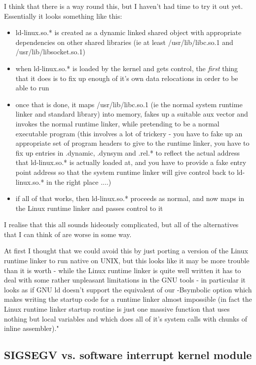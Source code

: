 \documentclass[letterpaper]{article}
\begin{document}
I think that there is a way round this, but I haven't had time to
try it out yet. Essentially it looks something like this:
\begin{itemize}
\item   ld-linux.so.* is created as a dynamic linked shared object
with appropriate dependencies on other shared libraries
(ie at least /usr/lib/libc.so.1 and /usr/lib/libsocket.so.1)
\item   when ld-linux.so.* is loaded by the kernel and gets control,
the {\itshape first\/} thing that it does is to fix up enough of it's
own data relocations in order to be able to run
\item   once that is done, it maps /usr/lib/libc.so.1 (ie the normal
system runtime linker and standard library) into memory,
fakes up a suitable aux vector and invokes the normal
runtime linker, while pretending to be a normal executable
program (this involves a lot of trickery - you have to fake up
an appropriate set of program headers to give to the runtime
linker, you have to fix up entries in .dynamic, .dynsym and
.rel.* to reflect the actual address that ld-linux.so.* is
actually loaded at, and you have to provide a fake entry
point address so that the system runtime linker will give
control back to ld-linux.so.* in the right place ....)
\item   if all of that works, then ld-linux.so.* proceeds as normal,
and now maps in the Linux runtime linker and passes control
to it
\end{itemize}

I realise that this all sounds hideously complicated, but all of the
alternatives that I can think of are worse in some way.

At first I thought that we could avoid this by just porting a
version of the Linux runtime linker to run native on UNIX, but
this looks like it may be more trouble than it is worth - while
the Linux runtime linker is quite well written it has to deal
with some rather unpleasant limitations in the GNU tools - in
particular it looks as if GNU ld doesn't support the equivalent
of our -Bsymbolic option which makes writing the startup code
for a runtime linker almost impossible (in fact the Linux runtime
linker startup routine is just one massive function that uses
nothing but local variables and which does all of it's system
calls with chunks of inline assembler)."




\subsection{SIGSEGV vs. software interrupt kernel module}
\end{document}
